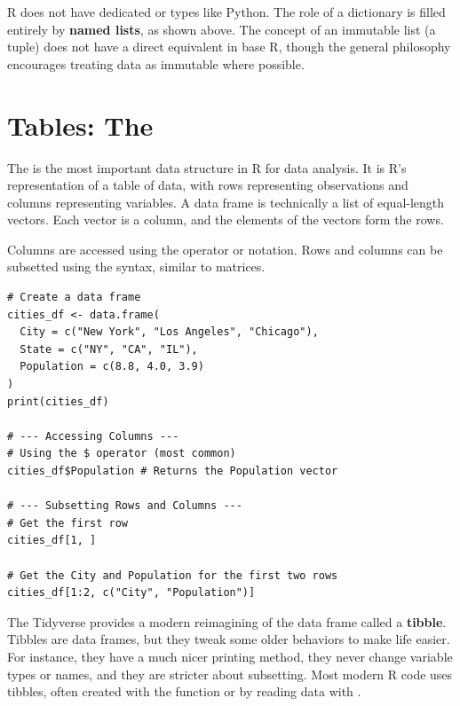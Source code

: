 \begin{remark}
R does not have dedicated  or  types like Python. The role of a dictionary is filled entirely by \textbf{named lists}, as shown above. The concept of an immutable list (a tuple) does not have a direct equivalent in base R, though the general philosophy encourages treating data as immutable where possible.
\end{remark}

\section{Tables: The }
\label{sec:r_data_frames}
The \textbf{} is the most important data structure in R for data analysis. It is R's representation of a table of data, with rows representing observations and columns representing variables. A data frame is technically a list of equal-length vectors. Each vector is a column, and the elements of the vectors form the rows.

Columns are accessed using the \rcode{$} operator or \rcode{[[...]]} notation. Rows and columns can be subsetted using the  syntax, similar to matrices.

\begin{example}
\text{ }\begin{verbatim}
# Create a data frame
cities_df <- data.frame(
  City = c("New York", "Los Angeles", "Chicago"),
  State = c("NY", "CA", "IL"),
  Population = c(8.8, 4.0, 3.9)
)
print(cities_df)

# --- Accessing Columns ---
# Using the $ operator (most common)
cities_df$Population # Returns the Population vector

# --- Subsetting Rows and Columns ---
# Get the first row
cities_df[1, ]

# Get the City and Population for the first two rows
cities_df[1:2, c("City", "Population")]
\end{verbatim}
\end{example}

\begin{remark}
The Tidyverse provides a modern reimagining of the data frame called a \textbf{tibble}. Tibbles are data frames, but they tweak some older behaviors to make life easier. For instance, they have a much nicer printing method, they never change variable types or names, and they are stricter about subsetting. Most modern R code uses tibbles, often created with the  function or by reading data with .
\end{remark}

